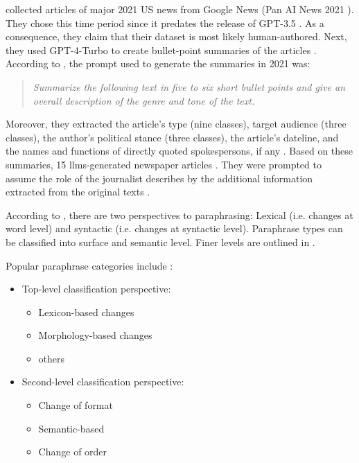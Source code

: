 \citet{ayele_overview_2024,bevendorff_overview_2024} collected articles of major 2021 US news from Google News (Pan AI News 2021 \citep{bevendorff_overview_2024}).
They chose this time period since it predates the release of GPT-3.5 \citep{bevendorff_overview_2024,ayele_overview_2024}.
As a consequence, they claim that their dataset is most likely human-authored.
Next, they used GPT-4-Turbo to create bullet-point summaries of the articles \citep{bevendorff_overview_2024,ayele_overview_2024}. 
According to \citet{bevendorff_overview_2024}, the prompt used to generate the summaries in 2021 was:
\begin{quote}
    \textit{Summarize the following text in five to six short bullet points and give an overall description
    of the genre and tone of the text.}
\end{quote}
Moreover, they extracted the article's type (nine classes), target audience (three classes), the author's political stance (three classes), the article's dateline, 
and the names and functions of directly quoted spokespersons, if any \citep{bevendorff_overview_2024}.
Based on these summaries, 15 \acp{llm}-generated newspaper articles \citep{ayele_overview_2024}.
They were prompted to assume the role of the journalist describes by the additional information extracted from the original texts \citep{bevendorff_overview_2024}.


According to \citet{gohsen_task_oriented_2024}, there are two perspectives to paraphrasing: 
Lexical (i.e. changes at word level) and syntactic (i.e. changes at syntactic level).
Paraphrase types can be classified into surface and semantic level. Finer levels are outlined in \citep{gohsen_task_oriented_2024}.

Popular paraphrase categories include \citep{fu_learning_2024}:
\begin{itemize}
    \item Top-level classification perspective: 
        \begin{itemize}
            \item Lexicon-based changes
            \item Morphology-based changes
            \item others
        \end{itemize}
    \item Second-level classification perspective:
        \begin{itemize}
            \item Change of format
            \item Semantic-based
            \item Change of order
        \end{itemize}
\end{itemize}

